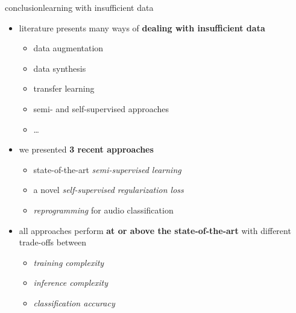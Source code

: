 \begin{frame}{conclusion}{learning with insufficient data}
    \vspace{-2mm}
    \begin{itemize}
        \item   literature presents many ways of \textbf{dealing with insufficient data}
            \begin{itemize}
                \item   data augmentation
                \item   data synthesis
                \item   transfer learning
                \item   semi- and self-supervised approaches
                \item   \ldots
            \end{itemize}
            \bigskip
        \item   we presented \textbf{3 recent approaches}
            \begin{itemize}
                \item   state-of-the-art \textit{semi-supervised learning}
                \item   a novel \textit{self-supervised regularization loss}
                \item   \textit{reprogramming} for audio classification
            \end{itemize}
            \bigskip
        \item   all approaches perform \textbf{at or above the state-of-the-art} with different trade-offs between
            \begin{itemize}
                \item   \textit{training complexity}
                \item   \textit{inference complexity}
                \item   \textit{classification accuracy}
            \end{itemize}
    \end{itemize}
\end{frame}
